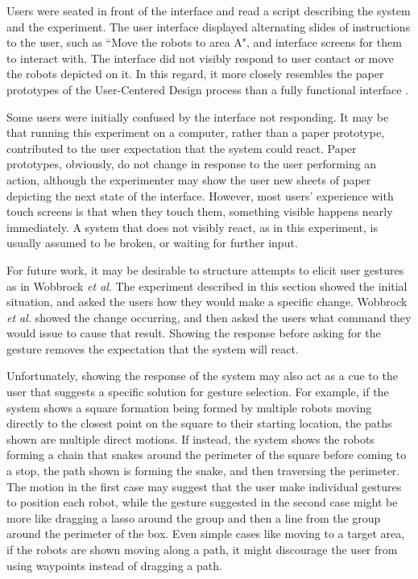 Users were seated in front of the interface and read a script describing the system and the experiment. The user interface displayed alternating slides of instructions to the user, such as ``Move the robots to area A", and interface screens for them to interact with. 
The interface did not visibly respond to user contact or move the robots depicted on it.
In this regard, it more closely resembles the paper prototypes of the User-Centered Design process than a fully functional interface \citep{ehn1992cardboard}.

Some users were initially confused by the interface not responding. 
It may be that running this experiment on a computer, rather than a paper prototype, contributed to the user expectation that the system could react.
Paper prototypes, obviously, do not change in response to the user performing an action, although the experimenter may show the user new sheets of paper depicting the next state of the interface. 
However, most users' experience with touch screens is that when they touch them, something visible happens nearly immediately. 
A system that does not visibly react, as in this experiment, is usually assumed to be broken, or waiting for further input.

For future work, it may be desirable to structure attempts to elicit user gestures as in Wobbrock \emph{et al}. 
The experiment described in this section showed the initial situation, and asked the users how they would make a specific change. 
Wobbrock \emph{et al.} showed the change occurring, and then asked the users what command they would issue to cause that result. 
Showing the response before asking for the gesture removes the expectation that the system will react. 

Unfortunately, showing the response of the system may also act as a cue to the user that suggests a specific solution for gesture selection. 
For example, if the system shows a square formation being formed by multiple robots moving directly to the closest point on the square to their starting location, the paths shown are multiple direct motions. 
If instead, the system shows the robots forming a chain that snakes around the perimeter of the square before coming to a stop, the path shown is forming the snake, and then traversing the perimeter. 
The motion in the first case may suggest that the user make individual gestures to position each robot, while the gesture suggested in the second case might be more like dragging a lasso around the group and then a line from the group around the perimeter of the box. 
Even simple cases like moving to a target area, if the robots are shown moving along a path, it might discourage the user from using waypoints instead of dragging a path.


